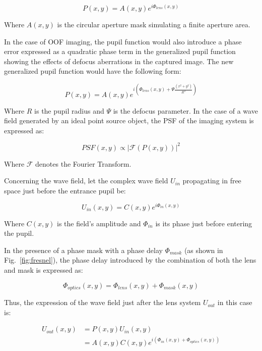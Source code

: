 \documentclass[preprint,5p,twocolumn]{elsarticle}
\begin{document}
\begin{equation}
    P(x,y)= A(x,y)e^{i\Phi_{lens}(x,y)}
\end{equation}

Where $A(x,y)$ is the circular aperture mask simulating a finite aperture area. 

In the case of OOF imaging, the pupil function would also introduce a phase error expressed as a quadratic phase term in the generalized pupil function showing the effects of defocus aberrations in the captured image. The new generalized pupil function would have the following form:

\begin{equation}
    P(x,y)= A(x,y)e^{i(\Phi_{lens}(x,y)+\Psi\frac{(x^2+y^2)}{R^2})}
\end{equation}

Where $R$ is the pupil radius and $\Psi$ is the defocus parameter.
In the case of a wave field generated by an ideal point source object, the PSF of the imaging system is expressed as:

\begin{equation}
    PSF(x,y) \propto \lvert \mathscr{F}(P(x,y)) \rvert^2
\end{equation}

Where $\mathscr{F}$ denotes the Fourier Transform.

Concerning the wave field,  let the complex wave field $U_{in}$ propagating in free space just before the entrance pupil be:

\begin{equation}
    U_{in}(x,y)= C(x,y)e^{i\Phi_{in}(x,y)}
\end{equation}

Where $C(x,y)$ is the field's amplitude and $\Phi_{in}$ is its phase just before entering the pupil.

In the presence of a phase mask with a phase delay $\Phi_{mask}$ (as shown in Fig.~\ref{fig:fresnel}), the phase delay introduced by the combination of both the lens and mask is expressed as:

\begin{equation}
    \Phi_{optics}(x,y)=\Phi_{lens}(x,y)+\Phi_{mask}(x,y)
\end{equation}

Thus, the expression of the wave field just after the lens system $U_{out}$ in this case is:

\begin{equation}
\begin{split}
    U_{out}(x,y) & =P(x,y)U_{in}(x,y)\\
    & = A(x,y)C(x,y)e^{i(\Phi_{in}(x,y)+\Phi_{optics}(x,y))}
    \end{split} 
\end{equation}
\end{document}
